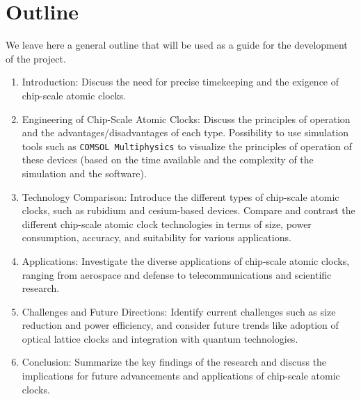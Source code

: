 \section{Outline}
\label{sec:outline}

We leave here a general outline that will be used as a guide for the development of the project.

\begin{enumerate}
    \item Introduction: Discuss the need for precise timekeeping and the exigence of chip-scale atomic clocks.

    \item Engineering of Chip-Scale Atomic Clocks: Discuss the principles of operation and the advantages/disadvantages of each type. Possibility to use simulation tools such as \texttt{COMSOL Multiphysics} to visualize the principles of operation of these devices (based on the time available and the complexity of the simulation and the software).

    \item Technology Comparison: Introduce the different types of chip-scale atomic clocks, such as rubidium and cesium-based devices. Compare and contrast the different chip-scale atomic clock technologies in terms of size, power consumption, accuracy, and suitability for various applications.


    \item Applications: Investigate the diverse applications of chip-scale atomic clocks, ranging from aerospace and defense to telecommunications and scientific research.

    \item Challenges and Future Directions: Identify current challenges such as size reduction and power efficiency, and consider future trends like adoption of optical lattice clocks and integration with quantum technologies.

    \item Conclusion: Summarize the key findings of the research and discuss the implications for future advancements and applications of chip-scale atomic clocks.
\end{enumerate}

